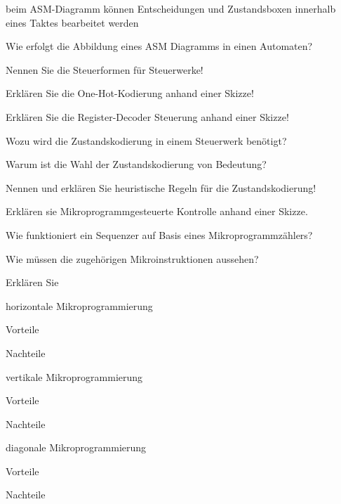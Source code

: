 \documentclass
[
  draft    = true,
  fontsize = 11pt,
  parskip  = half-,
  BCOR     = 0pt,
  DIV      = 11,
  ngerman,
  dvipsnames
]
{scrartcl}
\begin{document}
\begin{mytemize}
\begin{karsten}
\begin{mytemize}
  			\item beim ASM-Diagramm können Entscheidungen und Zustandsboxen innerhalb eines Taktes bearbeitet werden
  		\end{mytemize}
	\end{karsten}
  \item Wie erfolgt die Abbildung eines ASM Diagramms in einen Automaten?
  \item Nennen Sie die Steuerformen für Steuerwerke!
  \item Erklären Sie die One-Hot-Kodierung anhand einer Skizze!
  \item Erklären Sie die Register-Decoder Steuerung anhand einer Skizze!
  \item Wozu wird die Zustandskodierung in einem Steuerwerk benötigt?
        \begin{mytemize}
          \item Warum ist die Wahl der Zustandskodierung von Bedeutung?
          \item Nennen und erklären Sie heuristische Regeln für die Zustandskodierung!
        \end{mytemize}
  \item Erklären sie Mikroprogrammgesteuerte Kontrolle anhand einer Skizze.
  \item Wie funktioniert ein Sequenzer auf Basis eines Mikroprogrammzählers?
        \begin{mytemize}
          \item Wie müssen die zugehörigen Mikroinstruktionen aussehen?
        \end{mytemize}
  \item Erklären Sie
        \begin{mytemize}
          \item horizontale Mikroprogrammierung
                \begin{mytemize}
                  \item Vorteile
                  \item Nachteile
                \end{mytemize}
          \item vertikale Mikroprogrammierung
                \begin{mytemize}
                  \item Vorteile
                  \item Nachteile
                \end{mytemize}
          \item diagonale Mikroprogrammierung
                \begin{mytemize}
                  \item Vorteile
                  \item Nachteile
                \end{mytemize}
        \end{mytemize}
\end{mytemize}
\end{document}
